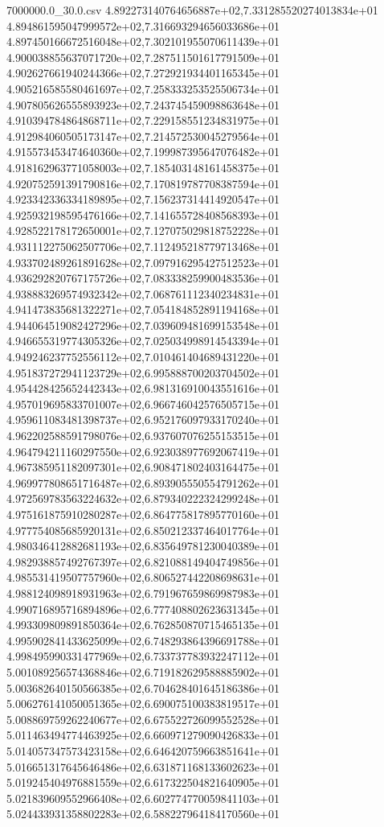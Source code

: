 \begin{filecontents*}{7000000.0_30.0.csv}
4.892273140764656887e+02,7.331285520274013834e+01
4.894861595047999572e+02,7.316693294656033686e+01
4.897450166672516048e+02,7.302101955070611439e+01
4.900038855637071720e+02,7.287511501617791509e+01
4.902627661940244366e+02,7.272921934401165345e+01
4.905216585580461697e+02,7.258333253525506734e+01
4.907805626555893923e+02,7.243745459098863648e+01
4.910394784864868711e+02,7.229158551234831975e+01
4.912984060505173147e+02,7.214572530045279564e+01
4.915573453474640360e+02,7.199987395647076482e+01
4.918162963771058003e+02,7.185403148161458375e+01
4.920752591391790816e+02,7.170819787708387594e+01
4.923342336334189895e+02,7.156237314414920547e+01
4.925932198595476166e+02,7.141655728408568393e+01
4.928522178172650001e+02,7.127075029818752228e+01
4.931112275062507706e+02,7.112495218779713468e+01
4.933702489261891628e+02,7.097916295427512523e+01
4.936292820767175726e+02,7.083338259900483536e+01
4.938883269574932342e+02,7.068761112340234831e+01
4.941473835681322271e+02,7.054184852891194168e+01
4.944064519082427296e+02,7.039609481699153548e+01
4.946655319774305326e+02,7.025034998914543394e+01
4.949246237752556112e+02,7.010461404689431220e+01
4.951837272941123729e+02,6.995888700203704502e+01
4.954428425652442343e+02,6.981316910043551616e+01
4.957019695833701007e+02,6.966746042576505715e+01
4.959611083481398737e+02,6.952176097933170240e+01
4.962202588591798076e+02,6.937607076255153515e+01
4.964794211160297550e+02,6.923038977692067419e+01
4.967385951182097301e+02,6.908471802403164475e+01
4.969977808651716487e+02,6.893905550554791262e+01
4.972569783563224632e+02,6.879340222324299248e+01
4.975161875910280287e+02,6.864775817895770160e+01
4.977754085685920131e+02,6.850212337464017764e+01
4.980346412882681193e+02,6.835649781230040389e+01
4.982938857492767397e+02,6.821088149404749856e+01
4.985531419507757960e+02,6.806527442208698631e+01
4.988124098918931963e+02,6.791967659869987983e+01
4.990716895716894896e+02,6.777408802623631345e+01
4.993309809891850364e+02,6.762850870715465135e+01
4.995902841433625099e+02,6.748293864396691788e+01
4.998495990331477969e+02,6.733737783932247112e+01
5.001089256574368846e+02,6.719182629588885902e+01
5.003682640150566385e+02,6.704628401645186386e+01
5.006276141050051365e+02,6.690075100383819517e+01
5.008869759262240677e+02,6.675522726099552528e+01
5.011463494774463925e+02,6.660971279090426833e+01
5.014057347573423158e+02,6.646420759663851641e+01
5.016651317645646486e+02,6.631871168133602623e+01
5.019245404976881559e+02,6.617322504821640905e+01
5.021839609552966408e+02,6.602774770059841103e+01
5.024433931358802283e+02,6.588227964184170560e+01

\end{filecontents*}

